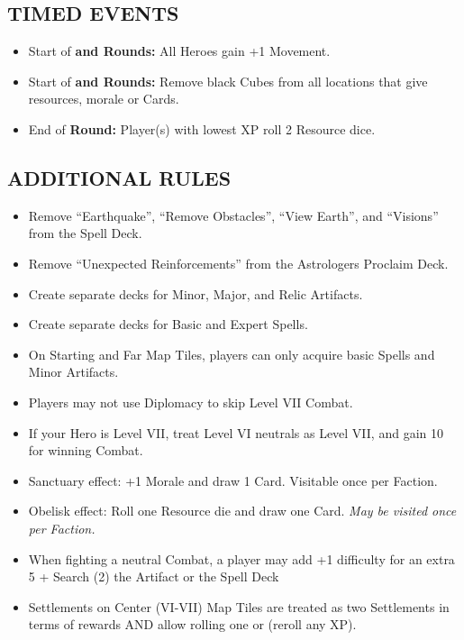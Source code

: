 \begin{multicols*}{2}
\subsection*{\MakeUppercase{Timed Events}}

\begin{itemize}
  \item Start of \textbf{ and  Rounds:} All Heroes gain +1 Movement.
  \item Start of \textbf{ and  Rounds:} Remove black Cubes from all locations that give resources, morale or Cards.
  \item End of \textbf{ Round:} Player(s) with lowest XP roll 2 Resource dice.
\end{itemize}

\subsection*{\MakeUppercase{Additional Rules}}
\begin{itemize}
  \item Remove ``Earthquake'', ``Remove Obstacles'', ``View Earth'', and ``Visions'' from the Spell Deck.
  \item Remove ``Unexpected Reinforcements'' from the Astrologers Proclaim Deck.
  \item Create separate decks for Minor, Major, and Relic Artifacts.
  \item Create separate decks for Basic and Expert Spells.
  \item On Starting and Far Map Tiles, players can only acquire basic Spells and Minor Artifacts.
  \item Players may not use Diplomacy to skip Level VII Combat.
  \item If your Hero is Level VII, treat Level VI neutrals as Level VII, and gain 10  for winning Combat.
  \item Sanctuary effect: +1 Morale and draw 1 Card. Visitable once per Faction.
  \item Obelisk effect: Roll one Resource die and draw one Card. \textit{May be visited once per Faction.}
  \item When fighting a neutral Combat, a player may add +1 difficulty for an extra 5  + Search (2) the Artifact or the Spell Deck
  \item Settlements on Center (VI-VII) Map Tiles are treated as two Settlements in terms of rewards AND allow rolling one  or  (reroll any XP).

\end{itemize}
\end{multicols*}
